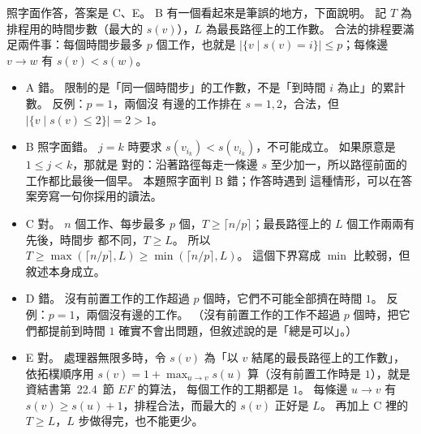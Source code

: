 \begin{pastsoln}
照字面作答，答案是 C、E。 B 有一個看起來是筆誤的地方，下面說明。 記 $T$ 為排程用的時間步數（最大的
$s(v)$），$L$ 為最長路徑上的工作數。 合法的排程要滿足兩件事：每個時間步最多 $p$ 個工作，也就是
$|\{v \mid s(v) = i\}| \le p$；每條邊 $v \to w$ 有 $s(v) < s(w)$。
\begin{itemize}
\item A 錯。 限制的是「同一個時間步」的工作數，不是「到時間 $i$ 為止」的累計數。 反例：$p = 1$，兩個沒
有邊的工作排在 $s = 1, 2$，合法，但 $|\{v \mid s(v) \le 2\}| = 2 > 1$。
\item B 照字面錯。 $j = k$ 時要求 $s(v_{i_k}) < s(v_{i_k})$，不可能成立。 如果原意是 $1 \le j < k$，那就是
對的：沿著路徑每走一條邊 $s$ 至少加一，所以路徑前面的工作都比最後一個早。 本題照字面判 B 錯；作答時遇到
這種情形，可以在答案旁寫一句你採用的讀法。
\item C 對。 $n$ 個工作、每步最多 $p$ 個，$T \ge \lceil n/p \rceil$；最長路徑上的 $L$ 個工作兩兩有先後，時間步
都不同，$T \ge L$。 所以 $T \ge \max(\lceil n/p \rceil, L) \ge \min(\lceil n/p \rceil, L)$。 這個下界寫成
$\min$ 比較弱，但敘述本身成立。
\item D 錯。 沒有前置工作的工作超過 $p$ 個時，它們不可能全部擠在時間 $1$。 反例：$p = 1$，兩個沒有邊的工作。
（沒有前置工作的工作不超過 $p$ 個時，把它們都提前到時間 $1$ 確實不會出問題，但敘述說的是「總是可以」。）
\item E 對。 處理器無限多時，令 $s(v)$ 為「以 $v$ 結尾的最長路徑上的工作數」，依拓樸順序用
$s(v) = 1 + \max_{u \to v} s(u)$ 算（沒有前置工作時是 $1$），就是資結書第~22.4~節 $\mathit{EF}$ 的算法，
每個工作的工期都是 $1$。 每條邊 $u \to v$ 有 $s(v) \ge s(u) + 1$，排程合法，而最大的 $s(v)$ 正好是 $L$。 再加上
C 裡的 $T \ge L$，$L$ 步做得完，也不能更少。
\end{itemize}
\end{pastsoln}
